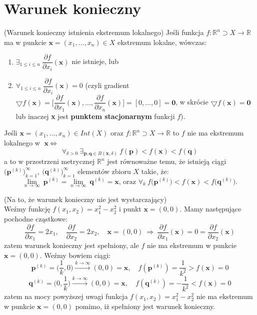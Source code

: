 \section{Warunek konieczny}

\begin{tw}{(Warunek konieczny istnienia ekstremum lokalnego)}
Jeśli funkcja $f:\mathbb{R}^n\supset X\rightarrow\mathbb{R}$ ma w punkcie $\textbf{x}=(x_1,\ldots,x_n)\in X$ ekstremum lokalne, wówczas:
\begin{enumerate}[\rm 1.]
\item
$\exists_{1\leq i\leq n}\ \dfrac{\partial f}{\partial x_i}(\textbf{x})$ nie istnieje, lub
\item
$\forall_{1\leq i\leq n}\ \dfrac{\partial f}{\partial x_i}(\textbf{x})=0$ (czyli gradient $\bigtriangledown f(\textbf{x})=\Big[\dfrac{\partial f}{\partial x_1}(\textbf{x}),\ldots,\dfrac{\partial f}{\partial x_n}(\textbf{x})\Big]=[0,\ldots,0]=\textbf{0}$, w skrócie $\bigtriangledown f(\textbf{x})=\textbf{0}$ lub inaczej \textbf{x} jest \textbf{punktem stacjonarnym} funkcji $f$).
\end{enumerate}
\end{tw}

\begin{uwg}
Jeśli $\textbf{x}=(x_1,\ldots,x_n)\in Int(X)$ oraz $f:\mathbb{R}^n\supset X\rightarrow\mathbb{R}$ to $f$ nie ma ekstremum lokalnego w $\textbf{x}\ \Leftrightarrow$ $$\forall_{\delta>0}\ \exists_{\textbf{p},\textbf{q}\in B(\textbf{x},\delta)}\ f(\textbf{p})<f(\textbf{x})<f(\textbf{q})$$ a to w przestrzeni metrycznej $\mathbb{R}^n$ jest równoważne temu, że istnieją ciągi $\big(\textbf{p}^{(k)}\big)_{k=1}^\infty,\ \big(\textbf{q}^{(k)}\big)_{k=1}^\infty$ elementów zbioru $X$ takie, że: $$\lim_{n \to \infty}\ \textbf{p}^{(k)}=\lim_{n \to \infty}\ \textbf{q}^{(k)}=\textbf{x}\textrm{, oraz }\forall_k\ f\big(\textbf{p}^{(k)}\big)<f(\textbf{x})<f\big(\textbf{q}^{(k)}\big).$$
\end{uwg}

\begin{przyk}{(Na to, że warunek konieczny nie jest wystarczający)}\\
Weźmy funkcję $f(x_1,x_2)=x_1^2-x_2^2$ i punkt $\textbf{x}=(0,0)$. Mamy następujące pochodne cząstkowe: $$\dfrac{\partial f}{\partial x_1}=2x_1,\quad \dfrac{\partial f}{\partial x_2}=2x_2,\quad\textbf{x}=(0,0)\ \Rightarrow\ \dfrac{\partial f}{\partial x_1}(\textbf{x})=0=\dfrac{\partial f}{\partial x_2}(\textbf{x})$$ zatem warunek konieczny jest spełniony, ale $f$ nie ma ekstremum w punkcie $\textbf{x}=(0,0)$. Weźmy bowiem ciągi: $$\textbf{p}^{(k)}=\Big(\dfrac{1}{k},0\Big)\xrightarrow{k\rightarrow \infty}(0,0)=\textbf{x},\quad f(\textbf{p}^{(k)})=\dfrac{1}{k^2}>f(\textbf{x})=0$$ $$\textbf{q}^{(k)}=\Big(0,\dfrac{1}{k}\Big)\xrightarrow{k\rightarrow \infty}(0,0)=\textbf{x},\quad f(\textbf{q}^{(k)})=-\dfrac{1}{k^2}<f(\textbf{x})=0$$ zatem na mocy powyższej uwagi funkcja $f(x_1,x_2)=x_1^2-x_2^2$ nie ma ekstremum w punkcie $\textbf{x}=(0,0)$ pomimo, iż spełniony jest warunek konieczny.

\end{przyk}

